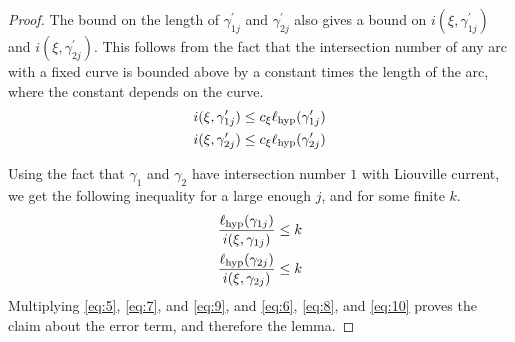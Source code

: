 \documentclass[12pt, reqno]{amsart}
\begin{document}
\begin{proof}
  The bound on the length of $\gamma_{1j}^{\prime}$ and $\gamma_{2j}^{\prime}$ also gives a bound on $i(\xi, \gamma_{1j}^{\prime})$ and $i(\xi, \gamma_{2j}^{\prime})$.
  This follows from the fact that the intersection number of any arc with a fixed curve is bounded above by a constant times the length of the arc, where the constant depends on the curve.
  \begin{align}
    \label{eq:7}
    i(\xi, \gamma_{1j}^{\prime}) &\leq c_\xi \ell_{\mathrm{hyp}}(\gamma_{1j}^{\prime}) \\
    \label{eq:8}
    i(\xi, \gamma_{2j}^{\prime}) &\leq c_\xi \ell_{\mathrm{hyp}}(\gamma_{2j}^{\prime}) \\
  \end{align}

  Using the fact that $\gamma_1$ and $\gamma_2$ have intersection number $1$ with Liouville current, we get the following inequality for a large enough $j$, and for some finite $k$.
  \begin{align}
    \label{eq:9}
    \frac{\ell_{\mathrm{hyp}}(\gamma_{1j})}{i(\xi, \gamma_{1j})} &\leq k \\
    \label{eq:10}
    \frac{\ell_{\mathrm{hyp}}(\gamma_{2j})}{i(\xi, \gamma_{2j})} &\leq k \\
  \end{align}
  Multiplying \eqref{eq:5}, \eqref{eq:7}, and \eqref{eq:9}, and \eqref{eq:6}, \eqref{eq:8}, and \eqref{eq:10} proves the claim about the error term, and therefore the lemma.
\end{proof}
\end{document}
